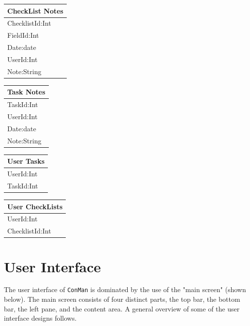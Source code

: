 \documentclass{article}
\begin{document}
\begin{tabular}{|l|} \hline
    \textbf{CheckList Notes} \\ \hline
    ChecklistId:Int\\
    FieldId:Int\\
    Date:date\\
    UserId:Int\\
    Note:String\\ \hline
\end{tabular}
\hfill
\begin{tabular}{|l|} \hline
    \textbf{Task Notes} \\ \hline
    TaskId:Int\\
    UserId:Int\\
    Date:date\\
    Note:String\\ \hline
\end{tabular}

\begin{tabular}{|l|} \hline
    \textbf{User Tasks} \\ \hline
    UserId:Int\\
    TaskId:Int\\ \hline
\end{tabular}
\hfill
\begin{tabular}{|l|} \hline
    \textbf{User CheckLists} \\ \hline
    UserId:Int\\
    ChecklistId:Int\\ \hline
\end{tabular}

\newpage
\section{User Interface}
The user interface of \texttt{ConMan} is dominated by the use of the "main screen" (shown below).  
The main screen consists of four distinct parts, the top bar, the bottom bar, the left pane, and the content area.
A general overview of some of the user interface designs follows.
\end{document}
